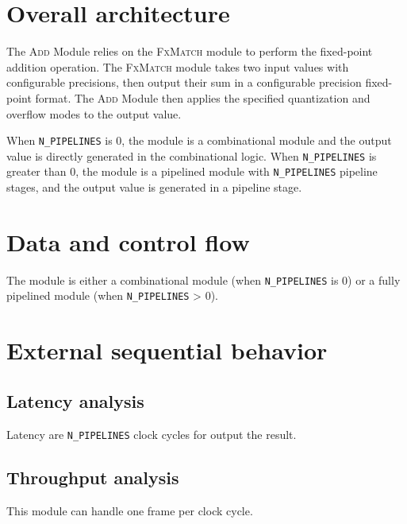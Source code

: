 \documentclass[a4paper, oneside]{report}
\begin{document}
        \section{Overall architecture}
                The \textsc{Add} Module relies on the \textsc{FxMatch} module to perform the fixed-point addition operation. The \textsc{FxMatch} module takes two input values with configurable precisions, then output their sum in a configurable precision fixed-point format. The \textsc{Add} Module then applies the specified quantization and overflow modes to the output value.

                When \texttt{N\_PIPELINES} is 0, the module is a combinational module and the output value is directly generated in the combinational logic. When \texttt{N\_PIPELINES} is greater than 0, the module is a pipelined module with \texttt{N\_PIPELINES} pipeline stages, and the output value is generated in a pipeline stage.
                
        \section{Data and control flow}
            The module is either a combinational module (when \texttt{N\_PIPELINES} is 0) or a fully pipelined module (when \texttt{N\_PIPELINES} > 0). 
            \section{External sequential behavior}
            \subsection{Latency analysis}
                Latency are \texttt{N\_PIPELINES} clock cycles for output the result.
            \subsection{Throughput analysis}
                This module can handle one frame per clock cycle.


\end{document}
